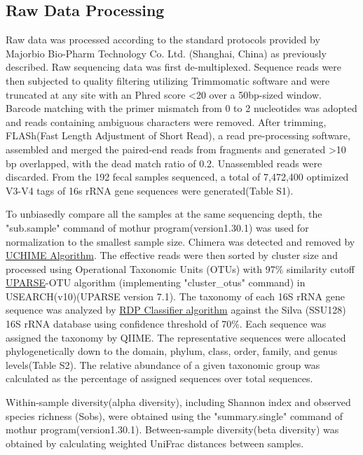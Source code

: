 \documentclass[fleqn,10pt, lineno]{wlpeerj} %
\begin{document}
  \subsection*{Raw Data Processing}
  Raw data was processed according to the standard protocols provided by Majorbio Bio-Pharm Technology Co. Ltd. (Shanghai, China) as previously described\citep{liu2018splenectomy, wang2018bacterial}. Raw sequencing data was first de-multiplexed. Sequence reads were then subjected to quality filtering utilizing Trimmomatic software\citep{bolger2014trimmomatic} and were truncated at any site with an Phred score \textless 20 over a 50bp-sized window. Barcode matching with the primer mismatch from 0 to 2 nucleotides was adopted and reads containing ambiguous characters were removed. After trimming, FLASh(Fast Length Adjustment of Short Read)\citep{magovc2011flash}, a read pre-processing software, assembled and merged the paired-end reads from fragments and generated \textgreater 10 bp overlapped, with the dead match ratio of 0.2. Unassembled reads were discarded. From the 192 fecal samples sequenced, a total of 7,472,400 optimized V3-V4 tags of 16s rRNA gene sequences were generated(Table S1).

  To unbiasedly compare all the samples at the same sequencing depth, the "sub.sample" command of mothur program(version1.30.1)\citep{schloss2009introducing} was used for normalization to the smallest sample size. Chimera was detected and removed by \href{https://www.drive5.com/usearch/manual/uchime_algo.html}{UCHIME Algorithm}. The effective reads were then sorted by cluster size and processed using Operational Taxonomic Units (OTUs) with 97\% similarity cutoff \href{http://drive5.com/uparse/}{UPARSE}-OTU algorithm (implementing "cluster\_otus" command)\citep{edgar2013uparse} in USEARCH(v10)(UPARSE version 7.1). The taxonomy of each 16S rRNA gene sequence was analyzed by \href{http://rdp.cme.msu.edu/}{RDP Classifier algorithm}\citep{wang2007naive} against the Silva (SSU128) 16S rRNA database\citep{quast2012silva} using confidence threshold of 70\%. Each sequence was assigned the taxonomy by QIIME\citep{caporaso2010qiime}. The representative sequences were allocated phylogenetically down to the domain, phylum, class, order, family, and genus levels(Table S2). The relative abundance of a given taxonomic group was calculated as the percentage of assigned sequences over total sequences.

   Within-sample diversity(alpha diversity), including Shannon index and observed species richness (Sobs), were obtained using the "summary.single" command of mothur program(version1.30.1)\citep{schloss2009introducing}. Between-sample diversity(beta diversity) was obtained by calculating weighted UniFrac distances between samples.
\end{document}
